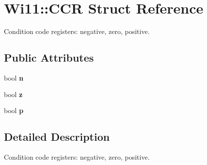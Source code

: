\hypertarget{structWi11_1_1CCR}{
\section{Wi11::CCR Struct Reference}
\label{structWi11_1_1CCR}
}


Condition code registers: negative, zero, positive.  


\subsection*{Public Attributes}
\begin{DoxyCompactItemize}
\item 
\hypertarget{structWi11_1_1CCR_a7e9b9c393d64db1165ea6a8cd2e58dee}{
bool {\bfseries n}}
\label{structWi11_1_1CCR_a7e9b9c393d64db1165ea6a8cd2e58dee}

\item 
\hypertarget{structWi11_1_1CCR_ad6f366ac578bd093ce61f20792ad2eb8}{
bool {\bfseries z}}
\label{structWi11_1_1CCR_ad6f366ac578bd093ce61f20792ad2eb8}

\item 
\hypertarget{structWi11_1_1CCR_add5febe92839418fdb0e54c0d94085b5}{
bool {\bfseries p}}
\label{structWi11_1_1CCR_add5febe92839418fdb0e54c0d94085b5}

\end{DoxyCompactItemize}


\subsection{Detailed Description}
Condition code registers: negative, zero, positive. 